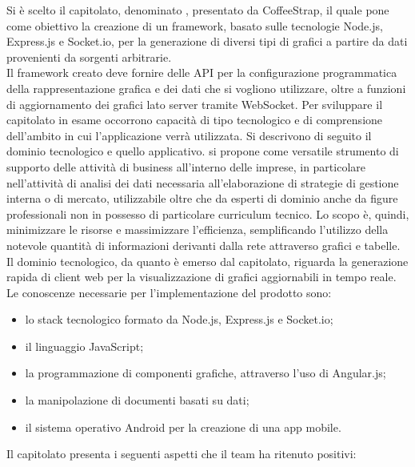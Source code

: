 		Si è scelto il capitolato, denominato \projectname, presentato da CoffeeStrap, il quale pone come obiettivo la creazione di un framework, basato sulle tecnologie Node.js, Express.js e Socket.io, per la generazione di diversi tipi di grafici a partire da dati provenienti da sorgenti arbitrarie.\\
		Il framework creato deve fornire delle API per la configurazione programmatica della rappresentazione grafica e dei dati che si vogliono utilizzare, oltre a funzioni di aggiornamento dei grafici lato server tramite WebSocket.
		Per sviluppare il capitolato in esame occorrono capacità di tipo tecnologico e di comprensione dell'ambito in cui l'applicazione verrà utilizzata. Si descrivono di seguito il dominio tecnologico e quello applicativo.
			\projectname{} si propone come versatile strumento di supporto delle attività di business all'interno delle imprese, in particolare nell'attività di analisi dei dati necessaria all'elaborazione di strategie di gestione interna o di mercato, utilizzabile oltre che da esperti di dominio anche da figure professionali non in possesso di particolare curriculum tecnico. Lo scopo è, quindi, minimizzare le risorse e massimizzare l'efficienza, semplificando l'utilizzo della notevole quantità di informazioni derivanti dalla rete attraverso grafici e tabelle.
			Il dominio tecnologico, da quanto è emerso dal capitolato, riguarda la generazione rapida di client web per la visualizzazione di grafici aggiornabili in tempo reale.\\
			Le conoscenze necessarie per l'implementazione del prodotto sono:
			\begin{itemize}
				\item lo stack tecnologico formato da Node.js, Express.js e Socket.io;
				\item il linguaggio JavaScript;
				\item la programmazione di componenti grafiche, attraverso l'uso di Angular.js;
				\item la manipolazione di documenti basati su dati;
				\item il sistema operativo Android per la creazione di una app mobile.
			\end{itemize}
		Il capitolato presenta i seguenti aspetti che il team ha ritenuto positivi:
